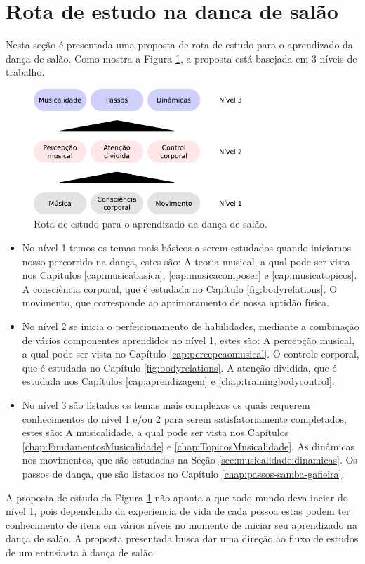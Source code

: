 \section{Rota de estudo na danca de salão}
\label{sec:dance-elements-processo}
Nesta seção é presentada uma proposta de rota de estudo para o aprendizado da
dança de salão. 
Como mostra a Figura \ref{fig:dance-elements-processo},
a proposta está basejada em 3 níveis de trabalho.
\begin{figure}[!h]
\centering
\includegraphics[width=0.7\textwidth]{chapters/cap-dance-elements/Diagrama-danca.eps}
\caption{Rota de estudo para o aprendizado da dança de salão.}
\label{fig:dance-elements-processo}
\end{figure}
\begin{itemize}
\item No nível 1 temos os temas mais básicos a serem estudados quando
iniciamos nosso percorrido na dança, estes são:
A teoria musical, a qual pode ser vista nos 
Capitulos \ref{cap:musicabasica}, \ref{cap:musicacomposer} e \ref{cap:musicatopicos}.
A consciência corporal, que é estudada no Capítulo \ref{fig:bodyrelations}.
O movimento, que corresponde ao aprimoramento de nossa aptidão física.
\item No nível 2 se inicia o perfeicionamento de habilidades,
mediante a combinação de vários componentes aprendidos no nível 1, estes são:
A percepção musical, a qual pode ser vista no Capítulo \ref{cap:percepcaomusical}.
O controle corporal, que é estudada no Capítulo \ref{fig:bodyrelations}.
A atenção dividida, que é estudada nos Capítulos \ref{cap:aprendizagem} e \ref{chap:trainingbodycontrol}.
\item No nível 3 são listados os temas mais complexos os quais
requerem conhecimentos do nível 1 e/ou 2 para serem satisfatoriamente completados,
estes são:
A musicalidade, a qual pode ser vista nos Capítulos \ref{chap:FundamentosMusicalidade} e \ref{chap:TopicosMusicalidade}.
As dinâmicas nos movimentos, que são estudadas na Seção \ref{sec:musicalidade:dinamicas}.
Os passos de dança, que são listados no Capítulo \ref{chap:passos-samba-gafieira}.
\end{itemize}
A proposta de estudo da Figura \ref{fig:dance-elements-processo} não aponta a que 
todo mundo deva inciar do nível 1, 
pois dependendo da experiencia de vida de cada pessoa estas podem ter conhecimento de itens
em vários níveis no momento de iniciar seu aprendizado na dança de salão.
A proposta presentada busca dar uma direção ao fluxo de estudos de um entusiasta à dança de salão.
